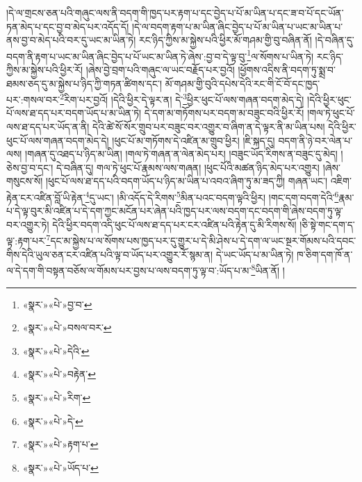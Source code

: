 །དེ་ལ་གྲངས་ཅན་པའི་གཞུང་ལས་ནི་བདག་གི་ཁྱད་པར་རྟག་པ་དང་བྱེད་པ་པོ་མ་ཡིན་པ་དང་ཟ་བ་པོ་དང་ཡོན་ཏན་མེད་པ་དང་བྱ་བ་མེད་པར་འདོད་དོ། །དེ་ལ་བདག་རྟག་པ་མ་ཡིན་ཞིང་བྱེད་པ་པོ་མ་ཡིན་པ་ཡང་མ་ཡིན་པ་ནས་བྱ་བ་མེད་པའི་བར་དུ་ཡང་མ་ཡིན་ཏེ། རང་ཉིད་ཀྱིས་མ་སྐྱེས་པའི་ཕྱིར་མོ་གཤམ་གྱི་བུ་བཞིན་ནོ། །དེ་བཞིན་དུ་བདག་ནི་རྟག་པ་ཡང་མ་ཡིན་ཞིང་བྱེད་པ་པོ་ཡང་མ་ཡིན་ཏེ་ཞེས་:བྱ་བ་དེ་ལྟ་བུ་\footnote{«སྣར་»«པེ་»བྱ་བ་}ལ་སོགས་པ་ཡིན་ཏེ། རང་ཉིད་ཀྱིས་མ་སྐྱེས་པའི་ཕྱིར་རོ། །ཞེས་བྱེ་བྲག་པའི་གཞུང་ལ་ཡང་བརྗོད་པར་བྱའོ། །ཕྱོགས་འདིས་ནི་བདག་ཏུ་སྨྲ་བ་ཐམས་ཅད་དུ་མ་སྐྱེས་པ་ཉིད་ཀྱི་གཏན་ཚིགས་དང་། མོ་གཤམ་གྱི་བུའི་དཔེས་དེའི་རང་གི་ངོ་བོ་དང་ཁྱད་པར་:གསལ་བར་\footnote{«སྣར་»«པེ་»བསལ་བར་}རིག་པར་བྱའོ། །དེའི་ཕྱིར་དེ་ལྟར་ན། དེ་\footnote{«སྣར་»«པེ་»དེའི་}ཕྱིར་ཕུང་པོ་ལས་གཞན་བདག་མེད་དེ། །དེའི་ཕྱིར་ཕུང་པོ་ལས་ཐ་དད་པར་བདག་ཡོད་པ་མ་ཡིན་ཏེ། དེ་དག་མ་གཏོགས་པར་བདག་མ་བཟུང་བའི་ཕྱིར་རོ། །གལ་ཏེ་ཕུང་པོ་ལས་ཐ་དད་པར་ཡོད་ན་ནི། དེའི་ཚེ་སོ་སོར་གྲུབ་པར་བཟུང་བར་འགྱུར་བ་ཞིག་ན་དེ་ལྟར་ནི་མ་ཡིན་པས། དེའི་ཕྱིར་ཕུང་པོ་ལས་གཞན་བདག་མེད་དེ། །ཕུང་པོ་མ་གཏོགས་དེ་འཛིན་མ་གྲུབ་ཕྱིར། །ཇི་སྐད་དུ། བདག་ནི་ཉེ་བར་ལེན་པ་ལས། །གཞན་དུ་འཐད་པ་ཉིད་མ་ཡིན། །གལ་ཏེ་གཞན་ན་ལེན་མེད་པར། །བཟུང་ཡོད་རིགས་ན་བཟུང་དུ་མེད། །ཅེས་བྱ་བ་དང་། དེ་བཞིན་དུ། གལ་ཏེ་ཕུང་པོ་རྣམས་ལས་གཞན། །ཕུང་པོའི་མཚན་ཉིད་མེད་པར་འགྱུར། །ཞེས་གསུངས་སོ། །ཕུང་པོ་ལས་ཐ་དད་པའི་བདག་ཡོད་པ་ཉིད་མ་ཡིན་པ་འབའ་ཞིག་ཏུ་མ་ཟད་ཀྱི། གཞན་ཡང་། འཇིག་རྟེན་ངར་འཛིན་བློ་ཡི་རྟེན་\footnote{«སྣར་»«པེ་»བརྟེན་}དུ་ཡང་། །མི་འདོད་དེ་རིགས་\footnote{«སྣར་»«པེ་»རིག་}མིན་པའང་བདག་ལྟའི་ཕྱིར། །གང་དག་བདག་དེའི་\footnote{«སྣར་»«པེ་»དེ་}རྣམ་པ་དེ་ལྟ་བུར་མི་འཛིན་པ་དེ་དག་ཀྱང་མངོན་པར་ཞེན་པའི་ཁྱད་པར་ལས་བདག་དང་བདག་གི་ཞེས་བདག་ཏུ་ལྟ་བར་འགྱུར་ཏེ། དེའི་ཕྱིར་བདག་འདི་ཕུང་པོ་ལས་ཐ་དད་པར་ངར་འཛིན་པའི་རྟེན་དུ་མི་རིགས་སོ། །ཅི་སྟེ་གང་དག་ད་ལྟ་:རྟག་པར་\footnote{«སྣར་»«པེ་»རྟག་པ་}དང་མ་སྐྱེས་པ་ལ་སོགས་པས་ཁྱད་པར་དུ་གྱུར་པ་དེ་མི་ཤེས་པ་དེ་དག་ལ་ཡང་སྔར་གོམས་པའི་དབང་གིས་དེའི་ཡུལ་ཅན་ངར་འཛིན་པའི་ལྟ་བ་ཡོད་པར་འགྱུར་རོ་སྙམ་ན། དེ་ཡང་ཡོད་པ་མ་ཡིན་ཏེ། ཁ་ཅིག་དག་ཁོ་ན་ལ་དེ་དག་གི་བསྟན་བཅོས་ལ་གོམས་པར་བྱས་པ་ལས་བདག་ཏུ་ལྟ་བ་:ཡོད་པ་མ་\footnote{«སྣར་»«པེ་»ཡོད་པ་}ཡིན་ནོ། །
